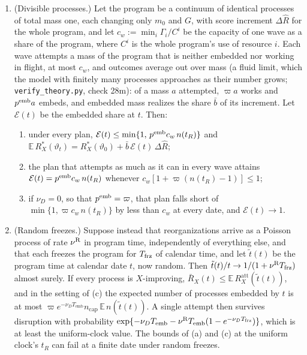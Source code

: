 \begin{proposition}
\begin{enumerate}
\item[(e)] (Divisible processes.) Let the program be a continuum of identical processes of total mass one, each changing only $m_0$ and $G$, with score increment $\Delta\hat R$ for the whole program, and let $c_w:=\min_i\Gamma_i/C^i$ be the capacity of one wave as a share of the program, where $C^i$ is the whole program's use of resource $i$. Each wave attempts a mass of the program that is neither embedded nor working in flight, at most $c_w$, and outcomes average out over mass (a fluid limit, which the model with finitely many processes approaches as their number grows; \texttt{verify\_theory.py}, check 28m): of a mass $a$ attempted, $\varpi a$ works and $p^{\rm emb}a$ embeds, and embedded mass realizes the share $\bar b$ of its increment. Let $\mathcal E(t)$ be the embedded share at $t$. Then:
\begin{enumerate}
\item[(i)] under every plan, $\mathcal E(t)\le\min\{1,\,p^{\rm emb}c_w\,n(t_R)\}$ and $\mathbb E\,R^*_X(\vartheta_t)=R^*_X(\vartheta_0)+\bar b\,\mathcal E(t)\,\Delta\hat R$;
\item[(ii)] the plan that attempts as much as it can in every wave attains $\mathcal E(t)=p^{\rm emb}c_w\,n(t_R)$ whenever $c_w[1+\varpi(n(t_R)-1)]\le1$;
\item[(iii)] if $\nu_D=0$, so that $p^{\rm emb}=\varpi$, that plan falls short of $\min\{1,\varpi c_w\,n(t_R)\}$ by less than $c_w$ at every date, and $\mathcal E(t)\to1$.
\end{enumerate}
\item[(f)] (Random freezes.) Suppose instead that reorganizations arrive as a Poisson process of rate $\nu^{\rm R}$ in program time, independently of everything else, and that each freezes the program for $T_{\rm frz}$ of calendar time, and let $\tilde t(t)$ be the program time at calendar date $t$, now random. Then $\tilde t(t)/t\to1/(1+\nu^{\rm R}T_{\rm frz})$ almost surely. If every process is $X$-improving, $\bar R_X(t)\le\mathbb E\,R^{\mathrm{att}}_X(\tilde t(t))$, and in the setting of (c) the expected number of processes embedded by $t$ is at most $\varpi e^{-\nu_DT_{\mathrm{emb}}}n_{\mathrm{cap}}\,\mathbb E\,n(\tilde t(t))$. A single attempt then survives disruption with probability $\exp\{-\nu_DT_{\mathrm{emb}}-\nu^{\rm R}T_{\mathrm{emb}}(1-e^{-\nu_DT_{\rm frz}})\}$, which is at least the uniform-clock value. The bounds of (a) and (c) at the uniform clock's $t_R$ can fail at a finite date under random freezes.
\end{enumerate}
\end{proposition}

